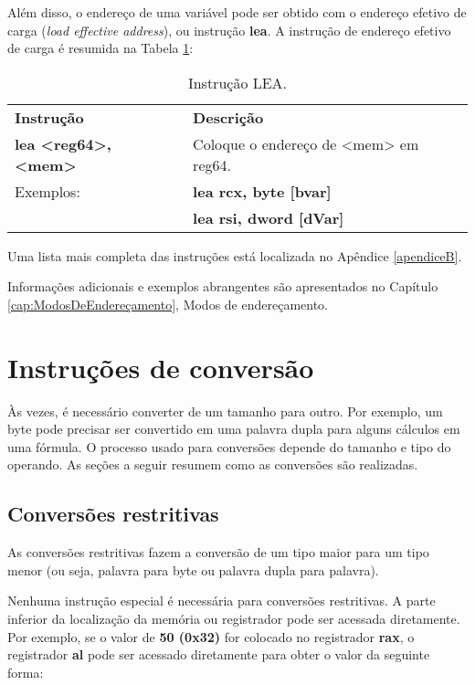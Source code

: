 Além disso, o endereço de uma variável pode ser obtido com o endereço efetivo de carga (\textit{load effective address}), ou instrução \textbf{lea}. A instrução de endereço efetivo de carga é resumida na Tabela \ref{tab:lea}:

\begin{table}[ht]
	\begin{center}
		\begin{tabular}{|ll|}
			\hline
			\rowcolor[HTML]{C0C0C0}
			\textbf{Instrução} & \textbf{Descrição} \\ 
			\textbf{lea	<reg64>, <mem>} & Coloque o endereço de <mem> em reg64.\\ \hline
			Exemplos:& \textbf{lea rcx, byte [bvar]}\\
			& \textbf{lea rsi, dword [dVar]}\\ \hline				
		\end{tabular}%
	\end{center}
	\caption{Instrução LEA.}
	\label{tab:lea}
\end{table}

Uma lista mais completa das instruções está localizada no Apêndice \ref{apendiceB}.

Informações adicionais e exemplos abrangentes são apresentados no Capítulo \ref{cap:ModosDeEndereçamento}, Modos de endereçamento.

\section{Instruções de conversão}
Às vezes, é necessário converter de um tamanho para outro. Por exemplo, um byte pode precisar ser convertido em uma palavra dupla para alguns cálculos em uma fórmula. O processo usado para conversões depende do tamanho e tipo do operando. As seções a seguir resumem como as conversões são realizadas.

\subsection{Conversões restritivas}
As conversões restritivas fazem a conversão de um tipo maior para um tipo menor (ou seja, palavra para byte ou palavra dupla para palavra).

Nenhuma instrução especial é necessária para conversões restritivas. A parte inferior da localização da memória ou registrador pode ser acessada diretamente. Por exemplo, se o valor de \textbf{50 (0x32)} for colocado no registrador \textbf{rax}, o registrador \textbf{al} pode ser acessado diretamente para obter o valor da seguinte forma:

